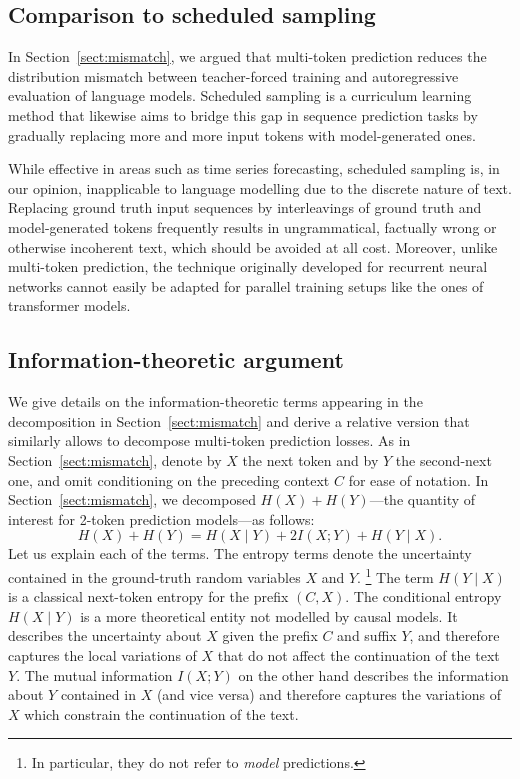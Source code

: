 \documentclass{article}
\theoremstyle{plain}
\theoremstyle{definition}
\theoremstyle{remark}
\begin{document}
\subsection{Comparison to scheduled sampling}
In Section~\ref{sect:mismatch}, we argued that multi-token prediction reduces the distribution mismatch between teacher-forced training and autoregressive evaluation of language models. Scheduled sampling \citep{bengio2015scheduled} is a curriculum learning method that likewise aims to bridge this gap in sequence prediction tasks by gradually replacing more and more input tokens with model-generated ones.

While effective in areas such as time series forecasting, scheduled sampling is, in our opinion, inapplicable to language modelling due to the discrete nature of text. Replacing ground truth input sequences by interleavings of ground truth and model-generated tokens frequently results in ungrammatical, factually wrong or otherwise incoherent text, which should be avoided at all cost. Moreover, unlike multi-token prediction, the technique originally developed for recurrent neural networks cannot easily be adapted for parallel training setups like the ones of transformer models.

\subsection{Information-theoretic argument}
\label{app:loss-dec}
We give details on the information-theoretic terms appearing in the decomposition in Section~\ref{sect:mismatch} and derive a relative version that similarly allows to decompose multi-token prediction losses. As in Section~\ref{sect:mismatch}, denote by $X$ the next token and by $Y$ the second-next one, and omit conditioning on the preceding context $C$ for ease of notation. In Section~\ref{sect:mismatch}, we decomposed $H(X) + H(Y)$---the quantity of interest for 2-token prediction models---as follows:
\begin{equation} \label{eq:entr-dec}
  H(X) + H(Y) = H(X \mid Y) + 2 I(X; Y) + H(Y \mid X).
\end{equation}
Let us explain each of the terms. The entropy terms denote the uncertainty contained in the ground-truth random variables $X$ and $Y$. \footnote{In particular, they do not refer to \emph{model} predictions.} The term $H(Y \mid X)$ is a classical next-token entropy for the prefix $(C, X)$. The conditional entropy $H(X \mid Y)$ is a more theoretical entity not modelled by causal models. It describes the uncertainty about $X$ given the prefix $C$ and suffix $Y$, and therefore captures the local variations of $X$ that do not affect the continuation of the text $Y$. The mutual information $I(X;Y)$ on the other hand describes the information about $Y$ contained in $X$ (and vice versa) and therefore captures the variations of $X$ which constrain the continuation of the text.
\end{document}
